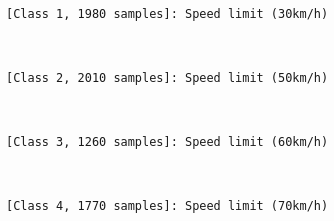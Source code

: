 \documentclass[11pt]{article}
\begin{document}
    \begin{center}
    \end{center}
    { \hspace*{\fill} \\}
    
    \begin{Verbatim}[commandchars=\\\{\}]
[Class 1, 1980 samples]: Speed limit (30km/h)

    \end{Verbatim}

    \begin{center}
    \end{center}
    { \hspace*{\fill} \\}
    
    \begin{Verbatim}[commandchars=\\\{\}]
[Class 2, 2010 samples]: Speed limit (50km/h)

    \end{Verbatim}

    \begin{center}
    \end{center}
    { \hspace*{\fill} \\}
    
    \begin{Verbatim}[commandchars=\\\{\}]
[Class 3, 1260 samples]: Speed limit (60km/h)

    \end{Verbatim}

    \begin{center}
    \end{center}
    { \hspace*{\fill} \\}
    
    \begin{Verbatim}[commandchars=\\\{\}]
[Class 4, 1770 samples]: Speed limit (70km/h)

    \end{Verbatim}
\end{document}
